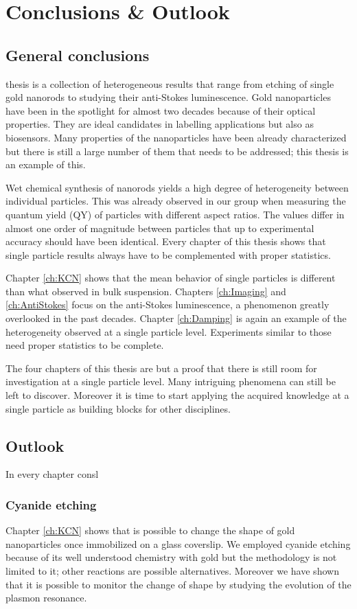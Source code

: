 \chapter{Conclusions \& Outlook}
\label{conclusions}

\section{General conclusions}
 thesis is a collection of heterogeneous results that range from
etching of single gold nanorods to studying their anti-Stokes luminescence. Gold
nanoparticles have been in the spotlight for almost two decades because of their
optical properties. They are ideal candidates in labelling applications but also
as biosensors. Many properties of the nanoparticles have been already
characterized but there is still a large number of them that needs to be
addressed; this thesis is an example of this.

Wet chemical synthesis of nanorods yields a high degree of heterogeneity between
individual particles. This was already observed in our group when measuring the
quantum yield (QY) of particles with different aspect ratios. The values differ
in almost one order of magnitude between particles that up to experimental
accuracy should have been identical. Every chapter of this thesis shows that
single particle results always have to be complemented with proper statistics.

Chapter \ref{ch:KCN} shows that the mean behavior of single particles is
different than what observed in bulk suspension. Chapters \ref{ch:Imaging} and
\ref{ch:AntiStokes} focus on the anti-Stokes luminescence, a phenomenon greatly
overlooked in the past decades. Chapter \ref{ch:Damping} is again an example of
the heterogeneity observed at a single particle level. Experiments similar to
those need proper statistics to be complete. 

The four chapters of this thesis are but a proof that there is still room for
investigation at a single particle level. Many intriguing phenomena can still be
left to discover. Moreover it is time to start applying the acquired knowledge
at a single particle as building blocks for other disciplines. 

\section{Outlook}
In every chapter consl

\subsection{Cyanide etching}
Chapter \ref{ch:KCN} shows that is possible to change the shape of gold
nanoparticles once immobilized on a glass coverslip. We employed cyanide etching
because of its well understood chemistry with gold but the methodology is not
limited to it; other reactions are possible alternatives. Moreover we have shown
that it is possible to monitor the change of shape by studying the evolution of
the plasmon resonance.

